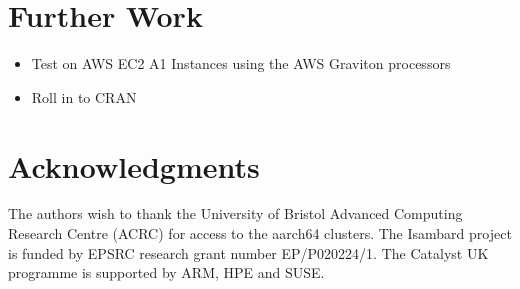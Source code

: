 \documentclass{article}
\begin{document}
\section{Further Work}

\begin{itemize}
    \item Test on AWS EC2 A1 Instances using the AWS Graviton processors
    \item Roll in to CRAN 
\end{itemize}

\section{Acknowledgments}

The authors wish to thank the University of Bristol Advanced Computing Research Centre (\textsc{ACRC}) for access to the aarch64 clusters. The Isambard project is funded by EPSRC research grant number EP/P020224/1. The Catalyst UK programme is supported by ARM, HPE and SUSE.

\printbibliography
\end{document}
